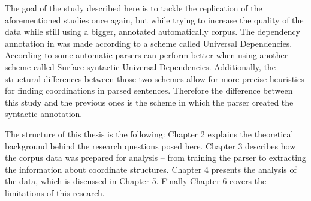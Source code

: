 The goal of the study described here is to tackle the replication of the aforementioned studies once again, but while trying to increase the quality of the data while still using a bigger, annotated automatically corpus. The dependency annotation in \cite{pbg2023} was made according to a scheme called Universal Dependencies. According to \cite{tuo:prz:lac:21} some automatic parsers can perform better when using another scheme called Surface-syntactic Universal Dependencies. Additionally, the structural differences between those two schemes allow for more precise heuristics for finding coordinations in parsed sentences. Therefore the difference between this study and the previous ones is the scheme in which the parser created the syntactic annotation. 

The structure of this thesis is the following: Chapter 2 explains the theoretical background behind the research questions posed here. Chapter 3 describes how the corpus data was prepared for analysis -- from training the parser to extracting the information about coordinate structures. Chapter 4 presents the analysis of the data, which is discussed in Chapter 5. Finally Chapter 6 covers the limitations of this research. 